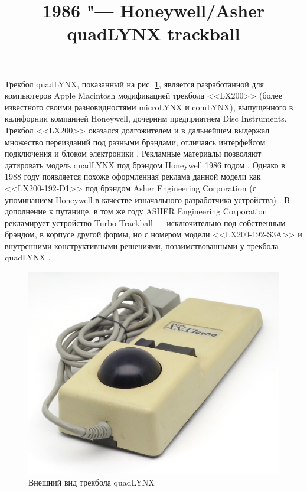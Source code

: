 \documentclass[11pt, a4paper]{article}
\begin{document}
\title{1986 "--- Honeywell/Asher quadLYNX trackball}
\date{}
\maketitle
{}
Трекбол quadLYNX, показанный на рис. \ref{fig:quadLYNXPic}, является разработанной для компьютеров Apple Macintosh модификацией трекбола <<LX200>> (более известного своими разновидностями microLYNX и comLYNX), выпущенного в калифорнии компанией Honeywell, дочерним предприятием Disc Instruments. Трекбол <<LX200>> оказался долгожителем и в дальнейшем выдержал множество переизданий под разными брэндами, отличаясь интерфейсом подключения и блоком электроники \cite{lx200}. Рекламные материалы позволяют датировать модель quadLYNX под брэндом Honeywell 1986 годом \cite{honeywell}. Однако в 1988 году появляется похоже оформленная реклама данной модели как <<LX200-192-D1>> под брэндом Asher Engineering Corporation (с упоминанием Honeywell в качестве изначального разработчика устройства) \cite{asher}. В дополнение к путанице, в том же году ASHER Engineering Corporation рекламирует устройство Turbo Trackball --- исключительно под собственным брэндом, в корпусе другой формы, но с номером модели <<LX200-192-S3A>> и внутренними конструктивными решениями, позаимствованными у трекбола quadLYNX \cite{turbo}.

\begin{figure}[h]
    \centering
    \includegraphics[scale=0.45]{1986_honeywell_asher_quadlynx_trackball/pic_30.jpg}
    \caption{Внешний вид трекбола quadLYNX}
    \label{fig:quadLYNXPic}
\end{figure}
\end{document}
